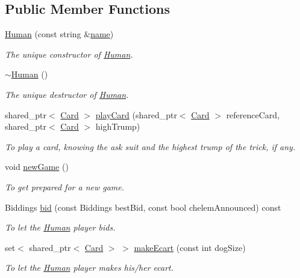 \subsection*{\-Public \-Member \-Functions}
\begin{DoxyCompactItemize}
\item 
\hyperlink{classHuman_abfd57b90d90f9222384c76b44346ba7b}{\-Human} (const string \&\hyperlink{classPlayer_acf0355128a99ee20ad9931b760fb2de1}{name})
\begin{DoxyCompactList}\small\item\em \-The unique constructor of \hyperlink{classHuman}{\-Human}. \end{DoxyCompactList}\item 
\hypertarget{classHuman_a93ca0fbf9e5b5bcb6f2f72eeb450219b}{\hyperlink{classHuman_a93ca0fbf9e5b5bcb6f2f72eeb450219b}{$\sim$\-Human} ()}\label{classHuman_a93ca0fbf9e5b5bcb6f2f72eeb450219b}

\begin{DoxyCompactList}\small\item\em \-The unique destructor of \hyperlink{classHuman}{\-Human}. \end{DoxyCompactList}\item 
shared\-\_\-ptr$<$ \hyperlink{classCard}{\-Card} $>$ \hyperlink{classHuman_a3258d3ce0eec7a5e393c639506ef28e5}{play\-Card} (shared\-\_\-ptr$<$ \hyperlink{classCard}{\-Card} $>$ reference\-Card, shared\-\_\-ptr$<$ \hyperlink{classCard}{\-Card} $>$ high\-Trump)
\begin{DoxyCompactList}\small\item\em \-To play a card, knowing the ask suit and the highest trump of the trick, if any. \end{DoxyCompactList}\item 
\hypertarget{classHuman_aae5efb6945fdbcda9c9a4d9e72d4a60e}{void \hyperlink{classHuman_aae5efb6945fdbcda9c9a4d9e72d4a60e}{new\-Game} ()}\label{classHuman_aae5efb6945fdbcda9c9a4d9e72d4a60e}

\begin{DoxyCompactList}\small\item\em \-To get prepared for a new game. \end{DoxyCompactList}\item 
\-Biddings \hyperlink{classHuman_a424bc9179b7036f22a694329b5f6fedf}{bid} (const \-Biddings best\-Bid, const bool chelem\-Announced) const 
\begin{DoxyCompactList}\small\item\em \-To let the \hyperlink{classHuman}{\-Human} player bids. \end{DoxyCompactList}\item 
set$<$ shared\-\_\-ptr$<$ \hyperlink{classCard}{\-Card} $>$ $>$ \hyperlink{classHuman_a02cdef89dde0adcb554f081e81f97896}{make\-Ecart} (const int dog\-Size)
\begin{DoxyCompactList}\small\item\em \-To let the \hyperlink{classHuman}{\-Human} player makes his/her ecart. \end{DoxyCompactList}\end{DoxyCompactItemize}


